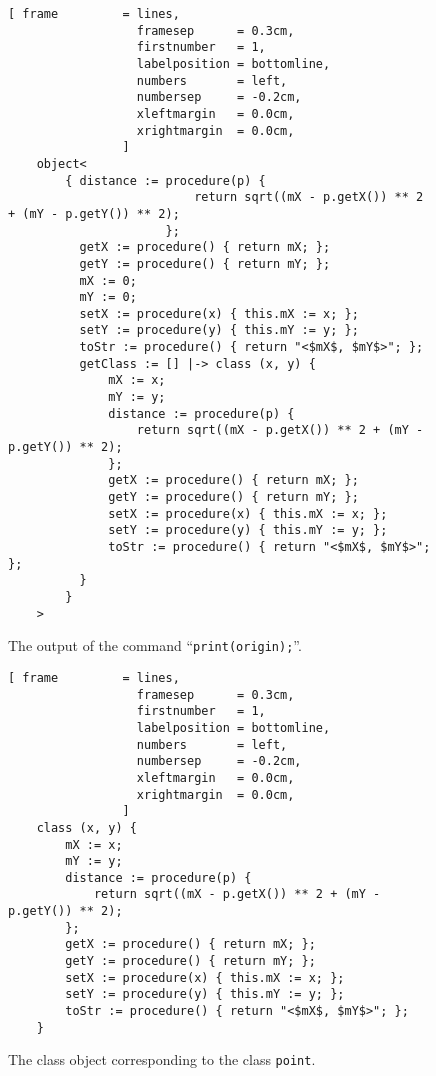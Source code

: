 \begin{figure}[!ht]
\centering
\begin{Verbatim}[ frame         = lines, 
                  framesep      = 0.3cm, 
                  firstnumber   = 1,
                  labelposition = bottomline,
                  numbers       = left,
                  numbersep     = -0.2cm,
                  xleftmargin   = 0.0cm,
                  xrightmargin  = 0.0cm,
                ]
    object<
        { distance := procedure(p) { 
                          return sqrt((mX - p.getX()) ** 2 + (mY - p.getY()) ** 2); 
                      }; 
          getX := procedure() { return mX; }; 
          getY := procedure() { return mY; }; 
          mX := 0; 
          mY := 0; 
          setX := procedure(x) { this.mX := x; }; 
          setY := procedure(y) { this.mY := y; }; 
          toStr := procedure() { return "<$mX$, $mY$>"; }; 
          getClass := [] |-> class (x, y) { 
              mX := x; 
              mY := y; 
              distance := procedure(p) { 
                  return sqrt((mX - p.getX()) ** 2 + (mY - p.getY()) ** 2); 
              }; 
              getX := procedure() { return mX; }; 
              getY := procedure() { return mY; }; 
              setX := procedure(x) { this.mX := x; }; 
              setY := procedure(y) { this.mY := y; }; 
              toStr := procedure() { return "<$mX$, $mY$>"; }; 
          }
        }
    >
\end{Verbatim}
\vspace*{-0.3cm}
\caption{The output of the command ``\texttt{print(origin);}''.}
\label{fig:print_origin}
\end{figure}

\begin{figure}[!ht]
\centering
\begin{Verbatim}[ frame         = lines, 
                  framesep      = 0.3cm, 
                  firstnumber   = 1,
                  labelposition = bottomline,
                  numbers       = left,
                  numbersep     = -0.2cm,
                  xleftmargin   = 0.0cm,
                  xrightmargin  = 0.0cm,
                ]
    class (x, y) { 
        mX := x; 
        mY := y; 
        distance := procedure(p) { 
            return sqrt((mX - p.getX()) ** 2 + (mY - p.getY()) ** 2); 
        }; 
        getX := procedure() { return mX; }; 
        getY := procedure() { return mY; }; 
        setX := procedure(x) { this.mX := x; }; 
        setY := procedure(y) { this.mY := y; }; 
        toStr := procedure() { return "<$mX$, $mY$>"; }; 
    }
\end{Verbatim}
\vspace*{-0.3cm}
\caption{The class object corresponding to the class \texttt{point}.}
\label{fig:point-class}
\end{figure}

